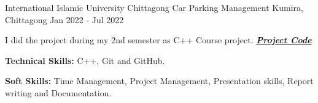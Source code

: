 \begin{cventries}
  \cventry
   {International Islamic University Chittagong} %
    {Car Parking  Management} %
    {Kumira, Chittagong} %
    {Jan 2022 - Jul 2022} %
    {
      \begin{cvitems} %
        \item {I did the project during my 2nd semester as C++ Course project.  \textbf{\href{https://github.com/sorowar-cse/CPP-Project-Car_Parking_Management}{\textit{Project Code}}}}
        \item {\textbf{Technical Skills:} C++, Git and GitHub.}
        \item {\textbf{Soft Skills:} Time Management, Project Management, Presentation skills, Report writing and Documentation.}
      \end{cvitems}
    }

\end{cventries}
